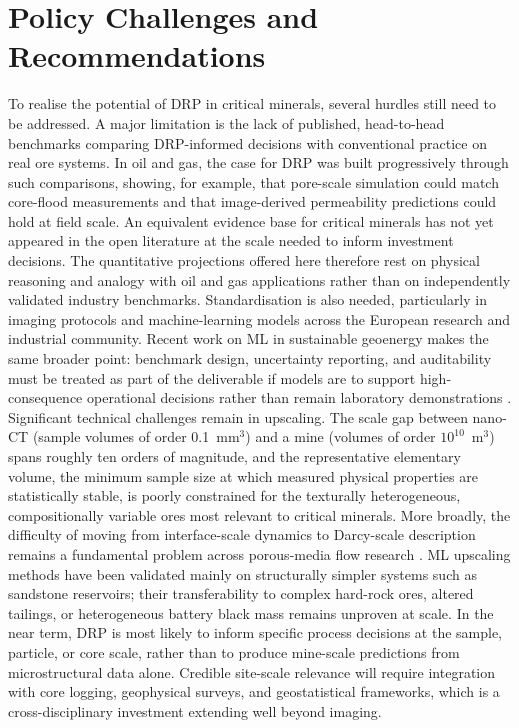 \documentclass[12pt,a4paper]{article}
\begin{document}
\section{Policy Challenges and Recommendations}
To realise the potential of DRP in critical minerals, several hurdles still need to be addressed. A major limitation is the lack of published, head-to-head benchmarks comparing DRP-informed decisions with conventional practice on real ore systems. In oil and gas, the case for DRP was built progressively through such comparisons, showing, for example, that pore-scale simulation could match core-flood measurements and that image-derived permeability predictions could hold at field scale. An equivalent evidence base for critical minerals has not yet appeared in the open literature at the scale needed to inform investment decisions. The quantitative projections offered here therefore rest on physical reasoning and analogy with oil and gas applications rather than on independently validated industry benchmarks. Standardisation is also needed, particularly in imaging protocols and machine-learning models across the European research and industrial community. Recent work on ML in sustainable geoenergy makes the same broader point: benchmark design, uncertainty reporting, and auditability must be treated as part of the deliverable if models are to support high-consequence operational decisions rather than remain laboratory demonstrations \cite{menke_geoenergy_ml_2026, abdellatif_benchmark_2026}. Significant technical challenges remain in upscaling. The scale gap between nano-CT (sample volumes of order 0.1~mm$^3$) and a mine (volumes of order $10^{10}$~m$^3$) spans roughly ten orders of magnitude, and the representative elementary volume, the minimum sample size at which measured physical properties are statistically stable, is poorly constrained for the texturally heterogeneous, compositionally variable ores most relevant to critical minerals. More broadly, the difficulty of moving from interface-scale dynamics to Darcy-scale description remains a fundamental problem across porous-media flow research \cite{berg_interface_darcy_2026}. ML upscaling methods have been validated mainly on structurally simpler systems such as sandstone reservoirs; their transferability to complex hard-rock ores, altered tailings, or heterogeneous battery black mass remains unproven at scale. In the near term, DRP is most likely to inform specific process decisions at the sample, particle, or core scale, rather than to produce mine-scale predictions from microstructural data alone. Credible site-scale relevance will require integration with core logging, geophysical surveys, and geostatistical frameworks, which is a cross-disciplinary investment extending well beyond imaging.
\end{document}
